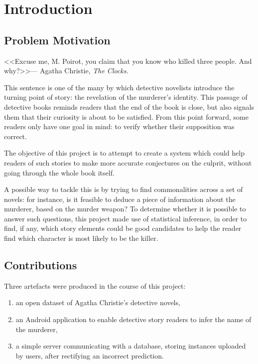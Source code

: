 \documentclass{mproj}
\begin{document}
\tableofcontents


\chapter{Introduction}\label{intro}

\section{Problem Motivation}

<<Excuse me, M. Poirot, you claim that you know who killed three people. And why?>>--- Agatha Christie, \textit{The Clocks}.

This sentence is one of the many by which detective novelists introduce the turning point of story: the revelation of the murderer's identity. This passage of detective books reminds readers that the end of the book is close, but also signals them that their curiosity is about to be satisfied. From this point forward, some readers only have one goal in mind: to verify whether their supposition was correct.

The objective of this project is to attempt to create a system which could help readers of such stories to make more accurate conjectures on the culprit, without going through the whole book itself. 

A possible way to tackle this is by trying to find commonalities across a set of novels: for instance, is it feasible to deduce a piece of information about the murderer, based on the murder weapon? To determine whether it is possible to answer such questions, this project made use of statistical inference, in order to find, if any, which story elements could be good candidates to help the reader find which character is most likely to be the killer.
\newpage

\section{Contributions}

Three artefacts were produced in the course of this project:
\begin{enumerate}
	\item an open dataset of Agatha Christie's detective novels,
	\item an Android application to enable detective story readers to infer the name of the murderer,
	\item a simple server communicating with a database, storing instances uploaded by users, after rectifying an incorrect prediction.
\end{enumerate}
\end{document}
